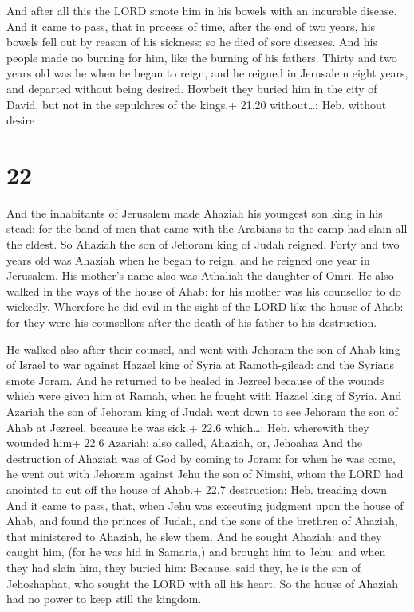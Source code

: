  And after all this the LORD smote him in his bowels with
an incurable disease.  And it came to pass, that in process
of time, after the end of two years, his bowels fell out by reason of
his sickness: so he died of sore diseases. And his people made no
burning for him, like the burning of his fathers.  Thirty
and two years old was he when he began to reign, and he reigned in
Jerusalem eight years, and departed without being desired. Howbeit they
buried him in the city of David, but not in the sepulchres of the
kings.+ 21.20 without\ldots: Heb. without desire

\hypertarget{section-21}{%
\section{22}\label{section-21}}

 And the inhabitants of Jerusalem made Ahaziah his youngest
son king in his stead: for the band of men that came with the Arabians
to the camp had slain all the eldest. So Ahaziah the son of Jehoram king
of Judah reigned.  Forty and two years old was Ahaziah when
he began to reign, and he reigned one year in Jerusalem. His mother's
name also was Athaliah the daughter of Omri.  He also walked
in the ways of the house of Ahab: for his mother was his counsellor to
do wickedly.  Wherefore he did evil in the sight of the LORD
like the house of Ahab: for they were his counsellors after the death of
his father to his destruction.

 He walked also after their counsel, and went with Jehoram
the son of Ahab king of Israel to war against Hazael king of Syria at
Ramoth-gilead: and the Syrians smote Joram.  And he returned
to be healed in Jezreel because of the wounds which were given him at
Ramah, when he fought with Hazael king of Syria. And Azariah the son of
Jehoram king of Judah went down to see Jehoram the son of Ahab at
Jezreel, because he was sick.+ 22.6 which\ldots: Heb. wherewith they
wounded him+ 22.6 Azariah: also called, Ahaziah, or, Jehoahaz
 And the destruction of Ahaziah was of God by coming to
Joram: for when he was come, he went out with Jehoram against Jehu the
son of Nimshi, whom the LORD had anointed to cut off the house of Ahab.+
22.7 destruction: Heb. treading down  And it came to pass,
that, when Jehu was executing judgment upon the house of Ahab, and found
the princes of Judah, and the sons of the brethren of Ahaziah, that
ministered to Ahaziah, he slew them.  And he sought Ahaziah:
and they caught him, (for he was hid in Samaria,) and brought him to
Jehu: and when they had slain him, they buried him: Because, said they,
he is the son of Jehoshaphat, who sought the LORD with all his heart. So
the house of Ahaziah had no power to keep still the kingdom.

